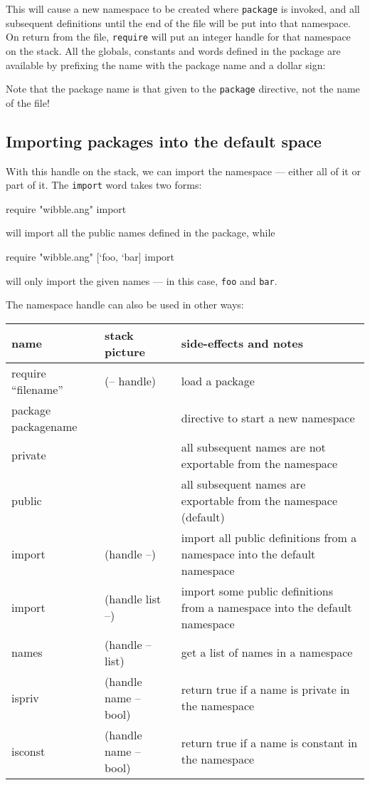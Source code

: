 This will cause a new namespace to be created where \texttt{package} is 
invoked, and all subsequent definitions until the end of the file will
be put into that namespace. On return from the file, \texttt{require} will
put an integer handle for that namespace on the stack. All the globals,
constants and words defined in the package are available by prefixing
the name with the package name and a dollar sign:
Note that the package name is that given to the \texttt{package} directive,
not the name of the file!

\subsection{Importing packages into the default space}
With this handle on the stack, we can import the namespace --- either
all of it or part of it. The \texttt{import} word takes two forms:
\begin{v}
require "wibble.ang" import
\end{v}
will import all the public names defined in the package, while
\begin{v}
require "wibble.ang" [`foo, `bar] import
\end{v}
will only import the given names --- in this case, \texttt{foo} and \texttt{bar}.

The namespace handle can also be used in other ways:
\begin{center}
\begin{tabular}{|l|l|p{3in}|}\hline
\textbf{name} & \textbf{stack picture} & \textbf{side-effects and notes}\\ \hline
require ``filename'' & (-- handle) & load a package\\
package packagename & & directive to start a new namespace \\
private & & all subsequent names are not exportable from the namespace\\
public & & all subsequent names are exportable from the namespace (default)\\\hline
import &(handle --) & import all public definitions from a namespace into the default namespace\\
import &(handle list --) & import some public definitions from a namespace into the default namespace\\
names & (handle -- list) & get a list of names in a namespace\\
ispriv & (handle name -- bool) & return true if a name is private in the namespace\\
isconst & (handle name -- bool) & return true if a name is constant in the namespace\\
\hline
\end{tabular}
\end{center}

